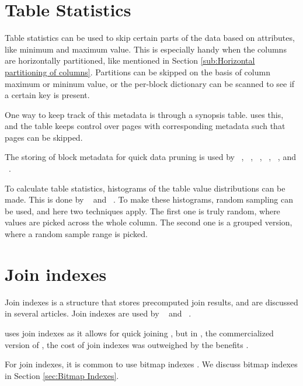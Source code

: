 \section{Table Statistics}
\label{sec:Table Statistics}
Table statistics can be used to skip certain parts of the data based on attributes, like minimum and maximum value. This is especially handy when the columns are horizontally partitioned, like mentioned in Section \ref{sub:Horizontal partitioning of columns}. Partitions can be skipped on the basis of column maximum or mininum value, or the per-block dictionary can be scanned to see if a certain key is present.

One way to keep track of this metadata is through a synopsis table. \ibm uses this, and the table keeps control over pages with corresponding metadata such that pages can be skipped.

The storing of block metadata for quick data pruning is used by \oracle~\cite{Lahiri2015-mz}, \ibm~\cite{Roman2013-em}, \vertica~\cite{Lamb2012-kg}, \monetx~\cite{Boncz2005-wj}, \mssql~\cite{Larson2013-mc}, and \exasol~\cite{Exasol2014-xh}.

To calculate table statistics, histograms of the table value distributions can be made. This is done by \ibm~\cite{Raman2013-em, Raman2008-gi} and \mssql~\cite{Larson2013-mc}. To make these histograms, random sampling can be used, and here two techniques apply. The first one is truly random, where values are picked across the whole column. The second one is a grouped version, where a random sample range is picked.

\section{Join indexes}
\label{sec:Join indexes}
Join indexes is a structure that stores precomputed join results, and are discussed in several articles. Join indexes are used by \monetdb~\cite{Boncz2002-yj} and \monetx~\cite{Boncz2005-wj}.  

\cstore uses join indexes as it allows for quick joining \cite{Stonebraker2005-qz}, but in \vertica, the commercialized version of \cstore, the cost of join indexes was outweighed by the benefits \cite{Lamb2012-kg}.

For join indexes, it is common to use bitmap indexes \cite{Bjorklund2011-wh}. We discuss bitmap indexes in Section \ref{sec:Bitmap Indexes}.

